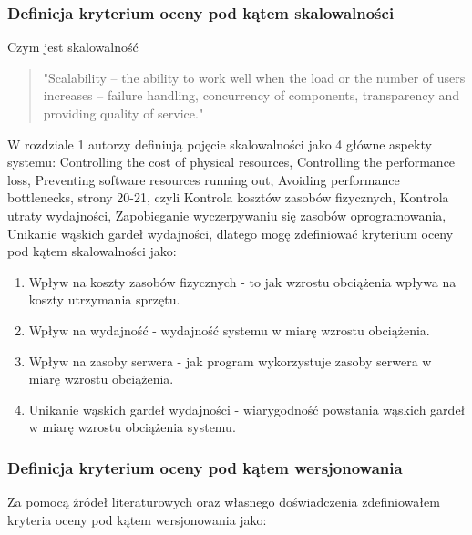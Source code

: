 \documentclass[runningheads,12pt]{llncs}
\begin{document}
\subsubsection{Definicja kryterium oceny pod kątem skalowalności}

Czym jest skalowalność 

\begin{quote}
    "Scalability – the ability to work well when the load or the number of users increases – failure handling, concurrency of components, transparency and providing quality of service." ~\cite[p. 21]{coulouris2011distributed}
\end{quote}

W rozdziale 1 autorzy definiują pojęcie skalowalności jako 4 główne aspekty systemu: Controlling the cost of physical resources, Controlling the performance loss, Preventing software resources running out, Avoiding performance bottlenecks, strony 20-21, czyli Kontrola kosztów zasobów fizycznych, Kontrola utraty wydajności, Zapobieganie wyczerpywaniu się zasobów oprogramowania, Unikanie wąskich gardeł wydajności, dlatego mogę zdefiniować kryterium oceny pod kątem skalowalności jako:

\begin{enumerate}
    \item Wpływ na koszty zasobów fizycznych - to jak wzrostu obciążenia wpływa na koszty utrzymania sprzętu.
    \item Wpływ na wydajność - wydajność systemu w miarę wzrostu obciążenia.
    \item Wpływ na zasoby serwera - jak program wykorzystuje zasoby serwera w miarę wzrostu obciążenia.
    \item Unikanie wąskich gardeł wydajności - wiarygodność powstania wąskich gardeł w miarę wzrostu obciążenia systemu.
\end{enumerate}

\subsubsection{Definicja kryterium oceny pod kątem wersjonowania}

Za pomocą źródeł literaturowych oraz własnego doświadczenia zdefiniowałem kryteria oceny pod kątem wersjonowania jako:
\end{document}
